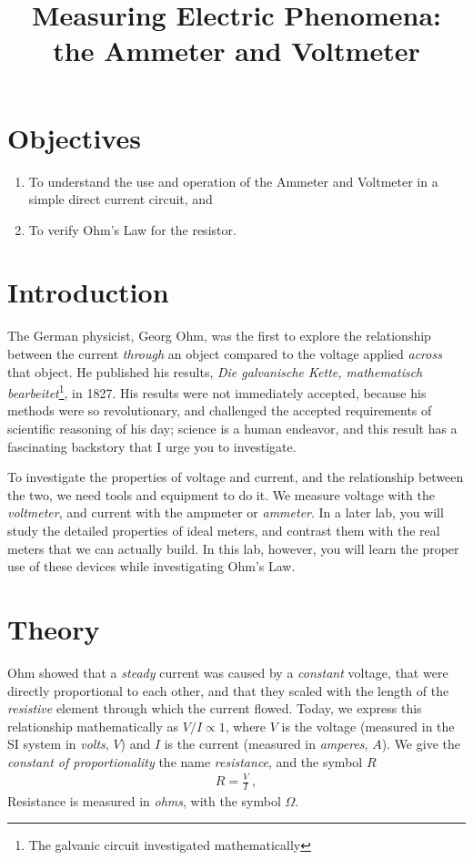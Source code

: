 \documentclass[12pt]{article}
\title{Measuring Electric Phenomena:\\the Ammeter and Voltmeter}
\author{}
\date{}
\begin{document}
\maketitle

\section{Objectives}
\label{sec:objectives}

\begin{enumerate}
\item To understand the use and operation of the Ammeter and
  Voltmeter in a simple direct current circuit, and
\item To verify Ohm's Law for the resistor.
\end{enumerate}

\section{Introduction}
\label{sec:introduction}

The German physicist, Georg Ohm, was the first to explore the
relationship between the current \textit{through} an object compared
to the voltage applied \textit{across} that object.  He published his
results, \textit{Die galvanische Kette, mathematisch
  bearbeitet}\footnote{The galvanic circuit investigated
  mathematically}, in 1827.  His results were not immediately
accepted, because his methods were so revolutionary, and challenged
the accepted requirements of scientific reasoning of his day; science
is a human endeavor, and this result has a fascinating backstory that
I urge you to investigate.

To investigate the properties of voltage and current, and the
relationship between the two, we need tools and equipment to do it.
We measure voltage with the \textit{voltmeter}, and current with the
ampmeter or \textit{ammeter}.  In a later lab, you will study the
detailed properties of ideal meters, and contrast them with the real
meters that we can actually build.  In this lab, however, you will
learn the proper use of these devices while investigating Ohm's Law.

\section{Theory}
\label{sec:theory}

Ohm showed that a \textit{steady} current was caused by a
\textit{constant} voltage, that were directly proportional to each
other, and that they scaled with the length of the \textit{resistive}
element through which the current flowed.  Today, we express this
relationship mathematically as $V/I \propto 1$, where $V$ is the
voltage (measured in the SI system in \textit{volts}, $V$) and $I$ is
the current (measured in \textit{amperes}, $A$).  We give the
\textit{constant of proportionality} the name \textit{resistance}, and
the symbol $R$
\begin{gather*}
  R = \frac{V}{I} \ ,
\end{gather*}
Resistance is measured in \textit{ohms}, with the symbol $\Omega$.
\end{document}
